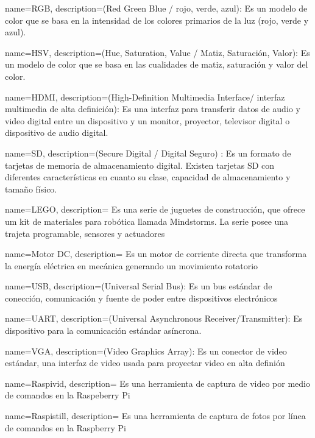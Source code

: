 {
  name=RGB,
  description={(Red Green Blue / rojo, verde, azul): Es un modelo de color que se basa en la intensidad de los colores primarios de la luz (rojo, verde y azul).}
}
  
{
  name=HSV,
  description={(Hue, Saturation, Value / Matiz, Saturación, Valor): Es un modelo de color que se basa en las cualidades de matiz, saturación y valor del color.}
}

{
  name=HDMI,
  description={(High-Definition Multimedia Interface/ interfaz multimedia de alta definición): Es una interfaz para transferir datos de audio y video digital entre un dispositivo y un monitor, proyector, televisor digital o dispositivo de audio digital.}
}

{
  name=SD,
  description={(Secure Digital / Digital Seguro) : Es un formato de tarjetas de memoria de almacenamiento digital. Existen tarjetas SD con diferentes características en cuanto su clase, capacidad de almacenamiento y tamaño físico.}
}  

{
  name=LEGO,
  description={ Es una serie de juguetes de construcci\'on, que ofrece um kit de materiales para rob\'otica llamada Mindstorms. La serie posee una trajeta programable, sensores y actuadores}
}  

{
  name=Motor DC,
  description={ Es un motor de corriente directa que transforma la energ\'ia el\'ectrica en mec\'anica generando un movimiento rotatorio}
}  

{
  name=USB,
  description={(Universal Serial Bus): Es un bus est\'andar de conecci\'on, comunicaci\'on y fuente de poder entre dispositivos electr\'onicos}
}  


{
  name=UART,
  description={(Universal Asynchronous Receiver/Transmitter): Es dispositivo para la comunicaci\'on est\'andar as\'incrona. }
}  

{
  name=VGA,
  description={(Video Graphics Array): Es un conector de video est\'andar, una interfaz de video usada para proyectar video en alta defini\'on }
}  

{
  name=Raspivid,
  description={ Es una herramienta de captura de video por medio de comandos en la Raspeberry Pi}
} 

{
  name=Raspistill,
  description={ Es una herramienta de captura de fotos por l\'inea de comandos en la Raspberry Pi }
} 
